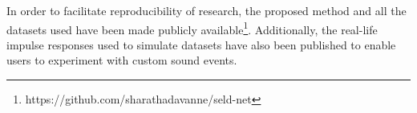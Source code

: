 \documentclass[journal]{IEEEtran}
\begin{document}

In order to facilitate reproducibility of research, the proposed method and all the datasets used have been made publicly available\footnote{https://github.com/sharathadavanne/seld-net}. Additionally, the real-life impulse responses used to simulate datasets have also been published to enable users to experiment with custom sound events.
\end{document}
